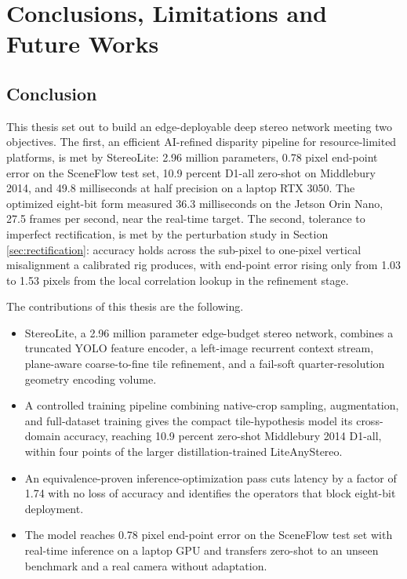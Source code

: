 \chapter{Conclusions, Limitations and Future Works}
\label{ch:conclusion}

\section{Conclusion}
This thesis set out to build an edge-deployable deep stereo network
meeting two objectives. The first, an efficient AI-refined disparity
pipeline for resource-limited platforms, is met by StereoLite: 2.96
million parameters, 0.78 pixel end-point error on the SceneFlow test set,
10.9 percent D1-all zero-shot on Middlebury 2014, and 49.8 milliseconds
at half precision on a laptop RTX 3050. The optimized eight-bit form
measured 36.3 milliseconds on the Jetson Orin Nano, 27.5 frames per
second, near the real-time target. The second, tolerance to imperfect
rectification, is met by the perturbation study in Section
\ref{sec:rectification}: accuracy holds across the sub-pixel to
one-pixel vertical misalignment a calibrated rig produces, with
end-point error rising only from 1.03 to 1.53 pixels from the local
correlation lookup in the refinement stage.

The contributions of this thesis are the following.
\begin{itemize}
\item StereoLite, a 2.96 million parameter edge-budget stereo network,
combines a truncated YOLO feature encoder, a left-image recurrent
context stream, plane-aware coarse-to-fine tile refinement, and a
fail-soft quarter-resolution geometry encoding volume.
\item A controlled training pipeline combining native-crop sampling,
augmentation, and full-dataset training gives the compact tile-hypothesis
model its cross-domain accuracy, reaching 10.9 percent zero-shot
Middlebury 2014 D1-all, within four points of the larger
distillation-trained LiteAnyStereo.
\item An equivalence-proven inference-optimization pass cuts latency by a
factor of 1.74 with no loss of accuracy and identifies the operators
that block eight-bit deployment.
\item The model reaches 0.78 pixel end-point error on the SceneFlow test
set with real-time inference on a laptop GPU and transfers zero-shot to
an unseen benchmark and a real camera without adaptation.
\end{itemize}

